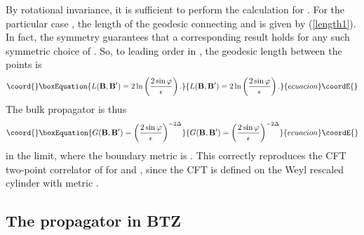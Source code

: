 \documentclass[a4paper,12pt]{article}
\begin{document}
By rotational invariance, it is sufficient to perform the calculation
for \coordHE{}.  For the particular case \coordHE{}, the length of the
geodesic connecting \coordHE{} and \coordHE{} is given by
(\ref{length1}).  In fact, the symmetry \myHighlight{$\epsilon(\tau,\varphi) =
\epsilon(\tau,-\varphi)$}\coordHE{} guarantees that a corresponding result holds
for any such symmetric choice of \myHighlight{$\epsilon$}\coordHE{}.  So, to leading order in
\myHighlight{$\epsilon$}\coordHE{}, the geodesic length between the points \coordHE{} is
\begin{equation}\coord{}\boxEquation{ 
L({\bf B},{\bf B'}) = 2 \ln\left(2\sin\varphi \over \epsilon \right).
\label{geodlen} 
}{ 
L({\bf B},{\bf B'}) = 2 \ln\left(2\sin\varphi \over \epsilon \right).
}{ecuacion}\coordE{}\end{equation} 
The bulk propagator is thus
\begin{equation}\coord{}\boxEquation{ 
G({\bf B},{\bf B'}) = \left(2 \sin\varphi \over
\epsilon \right)^{-2\Delta}
\label{eqt2} 
}{ 
G({\bf B},{\bf B'}) = \left(2 \sin\varphi \over
\epsilon \right)^{-2\Delta}
}{ecuacion}\coordE{}\end{equation} 
in the \coordHE{} limit, where the boundary metric is
\coordHE{}.  This
correctly reproduces the CFT two-point correlator of \cite{witten} for
\coordHE{} and \myHighlight{$\Delta \varphi = 2\varphi$}\coordHE{}, since the CFT is
defined on the Weyl rescaled cylinder with metric \coordHE{}.  

\subsection{The propagator in BTZ}
\label{prop-in-BTZ}
\end{document}
